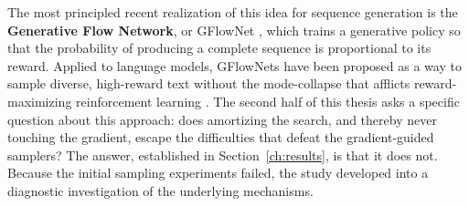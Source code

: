 The most principled recent realization of this idea for sequence generation is the \textbf{Generative Flow Network}, or GFlowNet \citep{bengio2021flow, bengio2023gflownet}, which trains a generative policy so that the probability of producing a complete sequence is proportional to its reward. Applied to language models, GFlowNets have been proposed as a way to sample diverse, high-reward text without the mode-collapse that afflicts reward-maximizing reinforcement learning \citep{hu2024amortizing}. The second half of this thesis asks a specific question about this approach: does amortizing the search, and thereby never touching the gradient, escape the difficulties that defeat the gradient-guided samplers? The answer, established in Section~\ref{ch:results}, is that it does not. Because the initial sampling experiments failed, the study developed into a diagnostic investigation of the underlying mechanisms.
%
%
